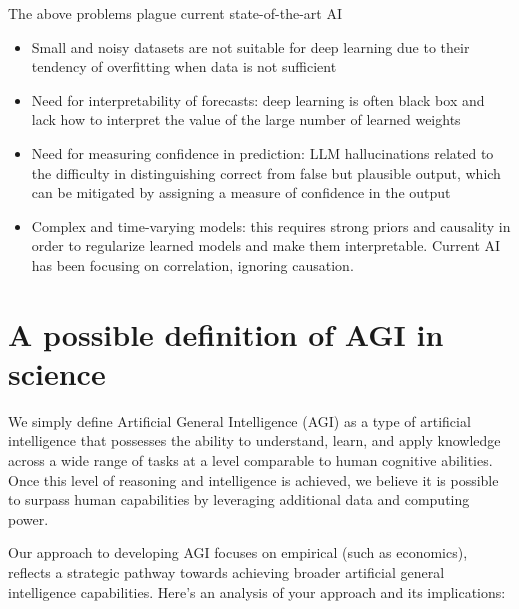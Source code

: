 \documentclass[11pt, reqno]{amsart}
\theoremstyle{definition}
\theoremstyle{remark}
\begin{document}
  The above problems plague current state-of-the-art AI
  \begin{itemize}
    \item Small and noisy datasets are not suitable for deep learning due to their
      tendency of overfitting when data is not sufficient

    \item Need for interpretability of forecasts: deep learning is often black box
      and lack how to interpret the value of the large number of learned weights

    \item Need for measuring confidence in prediction: LLM hallucinations related
      to the difficulty in distinguishing correct from false but plausible output,
      which can be mitigated by assigning a measure of confidence in the output

    \item Complex and time-varying models: this requires strong priors and causality
      in order to regularize learned models and make them interpretable.
      Current AI has been focusing on correlation, ignoring causation.
  \end{itemize}

  \section{A possible definition of AGI in science}

  We simply define Artificial General Intelligence (AGI) as a type of
  artificial intelligence that possesses the ability to understand, learn, and
  apply knowledge across a wide range of tasks at a level comparable to human
  cognitive abilities. Once this level of reasoning and intelligence is
  achieved, we believe it is possible to surpass human capabilities by
  leveraging additional data and computing power.


  Our approach to developing AGI focuses on empirical 
  (such as economics), reflects a strategic pathway towards achieving
  broader artificial general intelligence capabilities. Here's an analysis of
  your approach and its implications:
\end{document}
